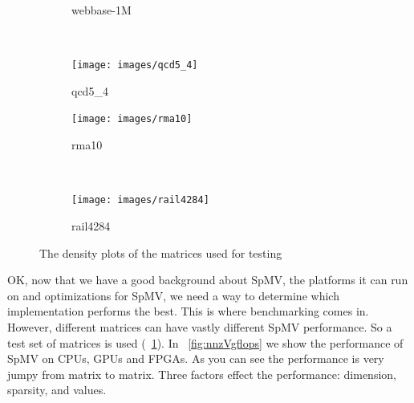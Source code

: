\begin{figure}
\begin{multicols}{4}
\begin{subfigure}{\linewidth}
\caption{webbase-1M}
\end{subfigure}~%
\begin{subfigure}{\linewidth}
    \texttt{[image: images/qcd5\_4]}
    \caption{qcd5\_4}
\end{subfigure}
\end{multicols}
\begin{multicols}{4}
\begin{subfigure}{\linewidth}
    \texttt{[image: images/rma10]}
    \caption{rma10}
\end{subfigure}~%
\begin{subfigure}{\linewidth}
    \texttt{[image: images/rail4284]}
    \caption{rail4284}
\end{subfigure}
\end{multicols}

\caption[Matrices]{The density plots of the matrices used for testing}
\label{fig:matrices}
\end{figure}
OK, now that we have a good background about SpMV, the platforms it can run on and optimizations for SpMV, we need a way to determine which implementation performs the best. This is where benchmarking comes in. However, different matrices can have vastly different SpMV performance. So a test set of matrices is used (\figurename~\ref{fig:matrices}). In \figurename~\ref{fig:nnzVgflops} we show the performance of SpMV on CPUs, GPUs and FPGAs. As you can see the performance is very jumpy from matrix to matrix. Three factors effect the performance: dimension, sparsity, and values. \par
